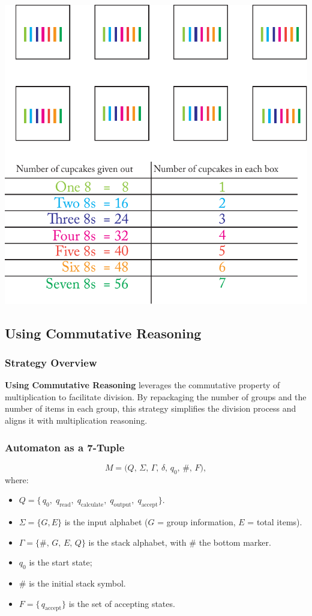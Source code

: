 \documentclass[11pt]{article}
\begin{document}
\includegraphics[width=.8\textwidth]{images/Easy_Pictures/SMR_DIV_UCR/PDF/SMR_DIV_UCR.pdf}


\subsection*{Using Commutative Reasoning}

\subsubsection*{Strategy Overview}
\textbf{Using Commutative Reasoning} leverages the commutative property of multiplication to facilitate division. By repackaging the number of groups and the number of items in each group, this strategy simplifies the division process and aligns it with multiplication reasoning.

\subsubsection*{Automaton as a 7-Tuple}
\[
M = 
\bigl(Q,\, \Sigma,\, \Gamma,\, \delta,\, q_{0},\, \#,\, F\bigr),
\]
where:
\begin{itemize}
    \item \(Q = \{\,q_{0},\; q_{\text{read}},\; q_{\text{calculate}},\; q_{\text{output}},\; q_{\text{accept}}\}\).
    \item \(\Sigma = \{G, E\}\) is the input alphabet 
          (\(G\) = group information, \(E\) = total items).
    \item \(\Gamma = \{\#,\, G,\, E,\, Q\}\) is the stack alphabet, with \(\#\) the bottom marker.
    \item \(q_{0}\) is the start state; 
    \item \(\#\) is the initial stack symbol.
    \item \(F = \{\,q_{\text{accept}}\}\) is the set of accepting states.
\end{itemize}
\end{document}
